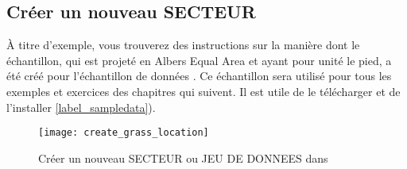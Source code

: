 \subsection{Créer un nouveau SECTEUR \grass}\label{sec:create_loc}


À titre d'exemple, vous trouverez des instructions sur la manière dont le  échantillon, qui est projeté en Albers Equal Area et ayant pour unité le pied, a été créé pour l'échantillon de données \qg. Ce  échantillon sera utilisé pour tous les exemples et exercices des chapitres \grass qui suivent. Il est utile de le télécharger et de l'installer \ref{label_sampledata}).

\begin{figure}[ht]
\begin{center}
\texttt{[image: create\_grass\_location]}
\caption{Créer un nouveau SECTEUR ou JEU DE DONNEES \grass dans \qg \nixcaption}
\label{fig:create_grass_location}
\end{center}  
\end{figure}


